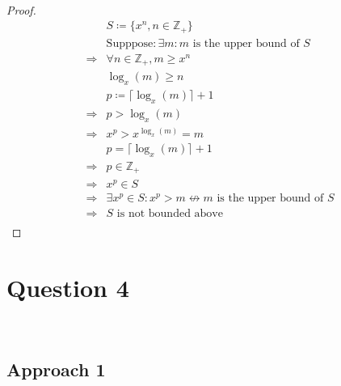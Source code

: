 \documentclass{article}
\begin{document}
~

\begin{proof}
    \begin{align*}
        &S\coloneqq\{x^n,n\in\mathbb{Z} _+\}\\
        &\text{Supppose}:\exists m:m\text{ is the upper bound of }S\\
        \Rightarrow&\forall n\in\mathbb{Z} _+,m\geqslant x^n\\
        &\log_{x}(m)\geqslant n\\
        &p\coloneqq\lceil\log_{x}(m) \rceil +1\\
        \Rightarrow&p>\log_{x}(m)\\
        \Rightarrow&x^p>x^{\log_{x}(m)}=m\\
        &p=\lceil\log_{x}(m) \rceil +1\\
        \Rightarrow&p\in\mathbb{Z} _+\\
        \Rightarrow&x^p\in S\\
        \Rightarrow&\exists x^p\in S:x^p>m\nleftrightarrow m\text{ is the upper bound of }S\\
        \Rightarrow&S\text{ is not bounded above}\\
    \end{align*}
\end{proof}

\newpage

\section*{Question 4}

~

\subsection*{Approach 1}

~
\end{document}

